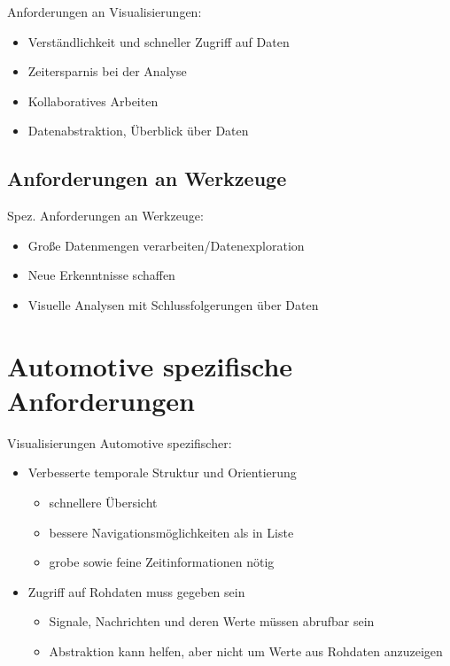\documentclass[draft=false
              ,paper=a4
              ,twoside=false
              ,fontsize=11pt
              ,headsepline
              ,BCOR10mm
              ,DIV11
              ]{scrbook}
\newcommand{\TODO}[1]{\colorbox{yellow}{\textcolor{red}{[TODO: #1]}}}
\begin{document}
Anforderungen an Visualisierungen:

\begin{itemize}
  \item Verständlichkeit und schneller Zugriff auf Daten
  \item Zeitersparnis bei der Analyse
  \item Kollaboratives Arbeiten
  \item Datenabstraktion, Überblick über Daten
\end{itemize}

\subsection{Anforderungen an Werkzeuge} %
\label{sub:anforderungen_an_werkzeuge}

Spez. Anforderungen an Werkzeuge:

\begin{itemize}
  \item Große Datenmengen verarbeiten/Datenexploration 
  \item Neue Erkenntnisse schaffen
  \item Visuelle Analysen mit Schlussfolgerungen über Daten
\end{itemize}

\section{Automotive spezifische Anforderungen} %
\label{sec:automotive_spezifische_anforderungen}
Visualisierungen Automotive spezifischer:

\begin{itemize}
  \item Verbesserte temporale Struktur und Orientierung
    \begin{itemize}
    \item schnellere Übersicht
    \item bessere Navigationsmöglichkeiten als in Liste
    \item grobe sowie feine Zeitinformationen nötig
  \end{itemize}
  \item Zugriff auf Rohdaten muss gegeben sein
  \begin{itemize}
    \item Signale, Nachrichten und deren Werte müssen abrufbar sein
    \item Abstraktion kann helfen, aber nicht um Werte aus Rohdaten anzuzeigen
  \end{itemize}
\end{itemize}
\end{document}
